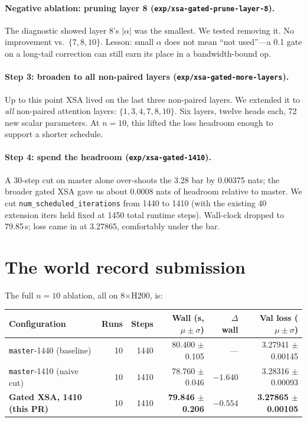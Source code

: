 \documentclass[10pt,letterpaper]{article}
\newcommand{\code}[1]{\texttt{\small #1}}
\newcommand{\val}[1]{\textbf{#1}}
\begin{document}
\paragraph{Negative ablation: pruning layer 8 (\code{exp/xsa-gated-prune-layer-8}).} The diagnostic showed layer 8's $|\alpha|$ was the smallest. We tested removing it. No improvement vs.\ $\{7,8,10\}$. Lesson: small $\alpha$ does not mean ``not used''---a 0.1 gate on a long-tail correction can still earn its place in a bandwidth-bound op.

\paragraph{Step 3: broaden to all non-paired layers (\code{exp/xsa-gated-more-layers}).} Up to this point XSA lived on the last three non-paired layers. We extended it to \emph{all} non-paired attention layers: $\{1,3,4,7,8,10\}$. Six layers, twelve heads each, 72 new scalar parameters. At $n=10$, this lifted the loss headroom enough to support a shorter schedule.

\paragraph{Step 4: spend the headroom (\code{exp/xsa-gated-1410}).} A 30-step cut on master alone over-shoots the 3.28 bar by 0.00375 nats; the broader gated XSA gave us about 0.0008 nats of headroom relative to master. We cut \code{num\_scheduled\_iterations} from 1440 to 1410 (with the existing 40 extension iters held fixed at 1450 total runtime steps). Wall-clock dropped to 79.85\,s; loss came in at 3.27865, comfortably under the bar.

\section{The world record submission}
\label{sec:wr}

The full $n=10$ ablation, all on 8\(\times\)H200, is:

\begin{center}
\begin{tabular}{lrrrrr}
\toprule
Configuration & Runs & Steps & Wall (s, $\mu \pm \sigma$) & $\Delta$ wall & Val loss ($\mu \pm \sigma$) \\
\midrule
\code{master}-1440 (baseline)               & 10 & 1440 & 80.400 \(\pm\) 0.105 & ---              & 3.27941 \(\pm\) 0.00145 \\
\code{master}-1410 (naive cut)              & 10 & 1410 & 78.760 \(\pm\) 0.046 & $-1.640$         & 3.28316 \(\pm\) 0.00093 \\
\val{Gated XSA, 1410 (this PR)}             & 10 & 1410 & \val{79.846 \(\pm\) 0.206} & \val{$-0.554$} & \val{3.27865 \(\pm\) 0.00105} \\
\bottomrule
\end{tabular}
\end{center}
\end{document}

